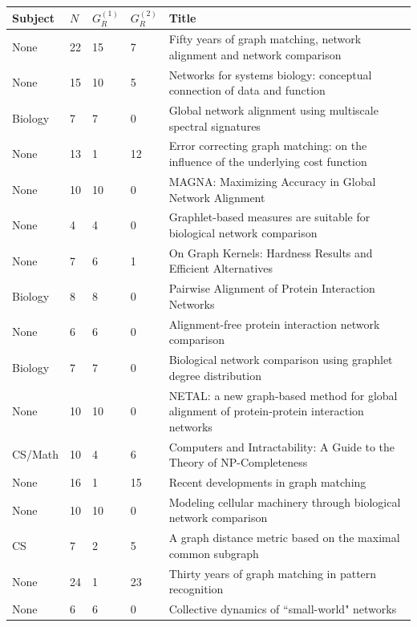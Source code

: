 \documentclass[12pt]{thesis}
\theoremstyle{plain}
\theoremstyle{definition}
\theoremstyle{remark}
\begin{document}
\begin{singlespace}
\begin{longtable}{|L{0.095\textwidth}|C{0.04\textwidth}|C{0.045\textwidth}|C{0.045\textwidth}|L{0.7\textwidth}|}
\hline
Subject & $N$ & $G_R^{(1)}$ & $G_R^{(2)}$ & Title \\ \hline
\hline
\endhead
None & 22 & 15 & 7 & Fifty years of graph matching, network alignment and network comparison \\ \hline
None & 15 & 10 & 5 & Networks for systems biology: conceptual connection of data and function \\ \hline
Biology & 7 & 7 & 0 & Global network alignment using multiscale spectral signatures \\ \hline
None & 13 & 1 & 12 & Error correcting graph matching: on the influence of the underlying cost function \\ \hline
None & 10 & 10 & 0 & MAGNA: Maximizing Accuracy in Global Network Alignment \\ \hline
None & 4 & 4 & 0 & Graphlet-based measures are suitable for biological network comparison \\ \hline
None & 7 & 6 & 1 & On Graph Kernels: Hardness Results and Efficient Alternatives \\ \hline
Biology & 8 & 8 & 0 & Pairwise Alignment of Protein Interaction Networks \\ \hline
None & 6 & 6 & 0 & Alignment-free protein interaction network comparison \\ \hline
Biology & 7 & 7 & 0 & Biological network comparison using graphlet degree distribution \\ \hline
None & 10 & 10 & 0 & NETAL: a new graph-based method for global alignment of protein-protein interaction networks \\ \hline
CS/Math & 10 & 4 & 6 & Computers and Intractability: A Guide to the Theory of NP-Completeness \\ \hline
None & 16 & 1 & 15 & Recent developments in graph matching \\ \hline
None & 10 & 10 & 0 & Modeling cellular machinery through biological network comparison \\ \hline
CS & 7 & 2 & 5 & A graph distance metric based on the maximal common subgraph \\ \hline
None & 24 & 1 & 23 & Thirty years of graph matching in pattern recognition \\ \hline
None & 6 & 6 & 0 & Collective dynamics of ``small-world" networks \\ \hline

\end{longtable}
\end{singlespace}
\end{document}
